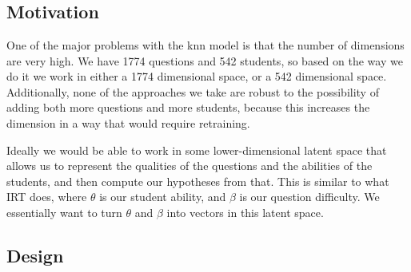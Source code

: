 \documentclass[twocolumn]{article}
\begin{document}
\section{}

\subsection{Motivation}

One of the major problems with the {\sc knn} model is that the number of
dimensions are very high. We have 1774 questions and 542 students, so based on
the way we do it we work in either a 1774 dimensional space, or a 542
dimensional space. Additionally, none of the approaches we take are robust to
the possibility of adding both more questions and more students, because this
increases the dimension in a way that would require retraining.

Ideally we would be able to work in some lower-dimensional latent space that
allows us to represent the qualities of the questions and the abilities of the
students, and then compute our hypotheses from that. This is similar to what
IRT does, where $\theta$ is our student ability, and $\beta$ is our question
difficulty. We essentially want to turn $\theta$ and $\beta$ into vectors in
this latent space.

\subsection{Design}
\end{document}
